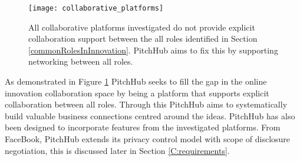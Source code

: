 \begin{figure}[ht]
    \centering
    \texttt{[image: collaborative\_platforms]}
    \caption{All collaborative platforms investigated do not provide explicit collaboration support between the all roles identified in Section \ref{commonRolesInInnovation}. PitchHub aims to fix this by supporting networking between all roles. }
    \label{fig:collaborative_platforms}
\end{figure}

As demonstrated in Figure \ref{fig:collaborative_platforms} PitchHub seeks to fill the gap in the online innovation collaboration space by being a platform that supports explicit collaboration between all roles. Through this PitchHub aims to systematically build valuable business connections centred around the ideas. PitchHub has also been designed to incorporate features from the investigated platforms. From FaceBook, PitchHub extends its privacy control model with scope of disclosure negotiation, this is discussed later in Section \ref{C:requirements}.